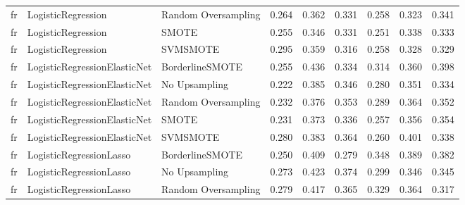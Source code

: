 \begin{tabular}{lllllllll}
      fr &           LogisticRegression & Random Oversampling & 0.264 &                     0.362 &                 0.331 &                  0.258 &                                   0.323 &     0.341 \\
      fr &           LogisticRegression &               SMOTE & 0.255 &                     0.346 &                 0.331 &                  0.251 &                                   0.338 &     0.333 \\
      fr &           LogisticRegression &            SVMSMOTE & 0.295 &                     0.359 &                 0.316 &                  0.258 &                                   0.328 &     0.329 \\
      fr & LogisticRegressionElasticNet &     BorderlineSMOTE & 0.255 &                     0.436 &                 0.334 &                  0.314 &                                   0.360 &     0.398 \\
      fr & LogisticRegressionElasticNet &       No Upsampling & 0.222 &                     0.385 &                 0.346 &                  0.280 &                                   0.351 &     0.334 \\
      fr & LogisticRegressionElasticNet & Random Oversampling & 0.232 &                     0.376 &                 0.353 &                  0.289 &                                   0.364 &     0.352 \\
      fr & LogisticRegressionElasticNet &               SMOTE & 0.231 &                     0.373 &                 0.336 &                  0.257 &                                   0.356 &     0.354 \\
      fr & LogisticRegressionElasticNet &            SVMSMOTE & 0.280 &                     0.383 &                 0.364 &                  0.260 &                                   0.401 &     0.338 \\
      fr &      LogisticRegressionLasso &     BorderlineSMOTE & 0.250 &                     0.409 &                 0.279 &                  0.348 &                                   0.389 &     0.382 \\
      fr &      LogisticRegressionLasso &       No Upsampling & 0.273 &                     0.423 &                 0.374 &                  0.299 &                                   0.346 &     0.345 \\
      fr &      LogisticRegressionLasso & Random Oversampling & 0.279 &                     0.417 &                 0.365 &                  0.329 &                                   0.364 &     0.317 \\

\end{tabular}
